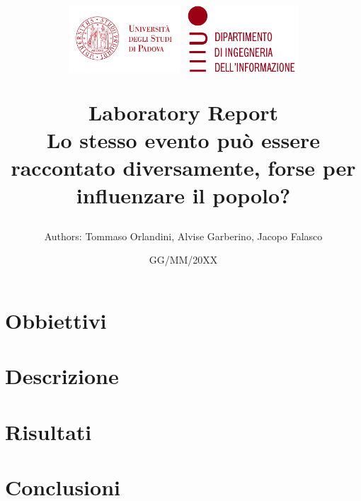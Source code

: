 \documentclass[twocolumn]{article}
\title{
    \vspace{-1cm}
    \includegraphics[height=2.5cm]{imgs/logo-unipd.pdf}
    \hfill
    \includegraphics[height=2.5cm]{imgs/logo-dei.pdf}
    \hfill
    \par
    \vspace{0.5cm}
    \textbf{Laboratory Report}\\
    Lo stesso evento può essere raccontato diversamente, forse per influenzare il popolo?

}
\author{
    Authors: {Tommaso Orlandini, Alvise Garberino, Jacopo Falasco}\\
}
\date{GG/MM/20XX}
\begin{document}
\maketitle


\section{Obbiettivi}
\lipsum[1]

\section{Descrizione}
\lipsum[2-5]

\section{Risultati}
\lipsum[6-8]

\section{Conclusioni}
\lipsum[1]



\end{document}
